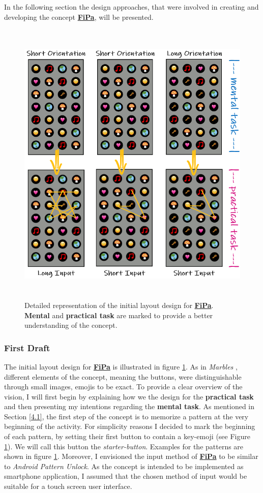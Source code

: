 In the following section the design approaches, that were involved in creating and developing the concept \underline{\textbf{FiPa}}, will be presented.

\begin{figure}[t!]
\centering
\includegraphics[width=14cm, height=14cm]{Chapters/graphics/firstdraft.PNG}
\caption{Detailed representation of the initial layout design for \underline{\textbf{FiPa}}. \textbf{Mental} and \textbf{practical task} are marked to provide a better understanding of the concept.}
\label{fig:firstdraft}
\end{figure}

\subsubsection{First Draft} \label{4.2.2.1}
The initial layout design for \underline{\textbf{FiPa}} is illustrated in figure \ref{fig:firstdraft}. As in \textit{Marbles} \cite{Marbles, Zezschwitz}, different elements of the concept, meaning the buttons, were distinguishable through small images, emojis to be exact. To provide a clear overview of the vision, I will first begin by explaining how we the design for the \textbf{practical task} and then presenting my intentions regarding the \textbf{mental task}. As mentioned in Section \ref{4.1}, the first step of the concept is to memorize a pattern at the very beginning of the activity. For simplicity reasons I decided to mark the beginning of each pattern, by setting their first button to contain a key-emoji (see Figure \ref{fig:firstdraft}). We will call this button the \textit{starter-button}. Examples for the patterns are shown in figure \ref{fig:firstdraft}. Moreover, I envisioned the input method of \underline{\textbf{FiPa}} to be similar to \textit{Android Pattern Unlock}. As the concept is intended to be implemented as smartphone application, I assumed that the chosen method of input would be suitable for a touch screen user interface. \\

